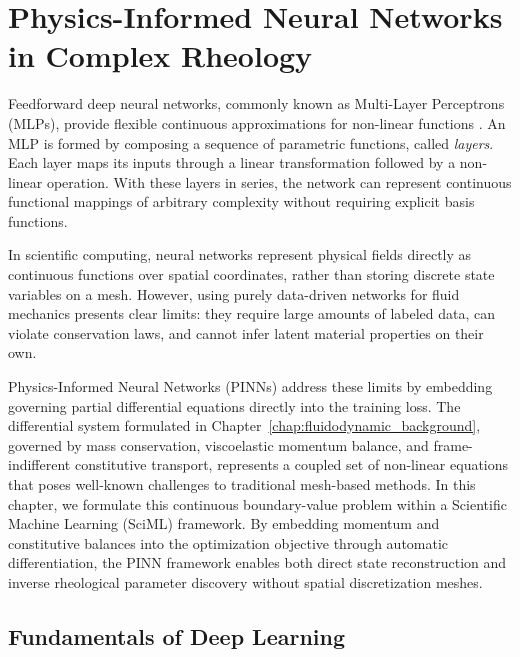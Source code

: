 \chapter{Physics-Informed Neural Networks in Complex Rheology}
\label{chap:pinn_literature}

Feedforward deep neural networks, commonly known as Multi-Layer Perceptrons (MLPs),
provide flexible continuous approximations for non-linear functions \cite{goodfellow2016deep}.
An MLP is formed by composing a sequence of parametric functions, called \textit{layers}.
Each layer maps its inputs through a linear transformation followed by a non-linear operation.
With these layers in series, the network can represent continuous functional mappings
of arbitrary complexity without requiring explicit basis functions.

In scientific computing, neural networks represent physical fields directly as
continuous functions over spatial coordinates, rather than storing discrete state variables on a mesh.
However, using purely data-driven networks for fluid mechanics presents clear limits:
they require large amounts of labeled data, can violate conservation laws,
and cannot infer latent material properties on their own.

Physics-Informed Neural Networks (PINNs) address these limits
by embedding governing partial differential equations directly into the training loss.
The differential system formulated in Chapter~\ref{chap:fluidodynamic_background}, governed by mass conservation,
viscoelastic momentum balance, and frame-indifferent constitutive transport,
represents a coupled set of non-linear equations that poses well-known challenges to traditional mesh-based methods.
In this chapter, we formulate this continuous boundary-value problem within a Scientific Machine Learning (SciML) framework.
By embedding momentum and constitutive balances into the optimization objective through automatic differentiation,
the PINN framework enables both direct state reconstruction and inverse rheological parameter discovery without spatial discretization meshes.

\section{Fundamentals of Deep Learning}
\label{sec:dl_fundamentals}

